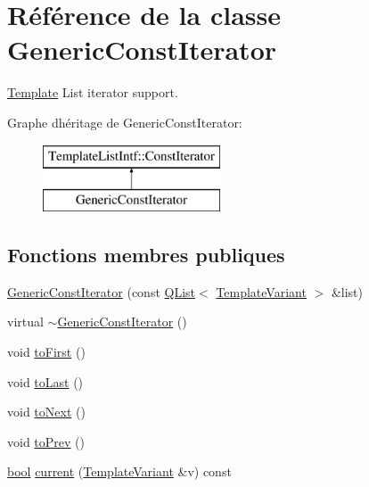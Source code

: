 \hypertarget{class_generic_const_iterator}{}\section{Référence de la classe Generic\+Const\+Iterator}
\label{class_generic_const_iterator}


\hyperlink{class_template}{Template} List iterator support.  


Graphe d\textquotesingle{}héritage de Generic\+Const\+Iterator\+:\begin{figure}[H]
\begin{center}
\leavevmode
\includegraphics[height=2.000000cm]{class_generic_const_iterator}
\end{center}
\end{figure}
\subsection*{Fonctions membres publiques}
\begin{DoxyCompactItemize}
\item 
\hyperlink{class_generic_const_iterator_af36df491d68e9082bc00551bf09d7155}{Generic\+Const\+Iterator} (const \hyperlink{class_q_list}{Q\+List}$<$ \hyperlink{class_template_variant}{Template\+Variant} $>$ \&list)
\item 
virtual \hyperlink{class_generic_const_iterator_a22c73f68a62963c673f63a072bbbe880}{$\sim$\+Generic\+Const\+Iterator} ()
\item 
void \hyperlink{class_generic_const_iterator_abb4c60f119f4ad23523b96080cfabd3e}{to\+First} ()
\item 
void \hyperlink{class_generic_const_iterator_a53787d6c70cff35f1edb8b3ced0530aa}{to\+Last} ()
\item 
void \hyperlink{class_generic_const_iterator_a2ac3dc44a25c4790bd2a816b240f6a24}{to\+Next} ()
\item 
void \hyperlink{class_generic_const_iterator_aeafefa5d7969558a52c32817fd8e7457}{to\+Prev} ()
\item 
\hyperlink{qglobal_8h_a1062901a7428fdd9c7f180f5e01ea056}{bool} \hyperlink{class_generic_const_iterator_ac2bfe63be660f41a71b99730b7f6895b}{current} (\hyperlink{class_template_variant}{Template\+Variant} \&v) const 
\end{DoxyCompactItemize}


